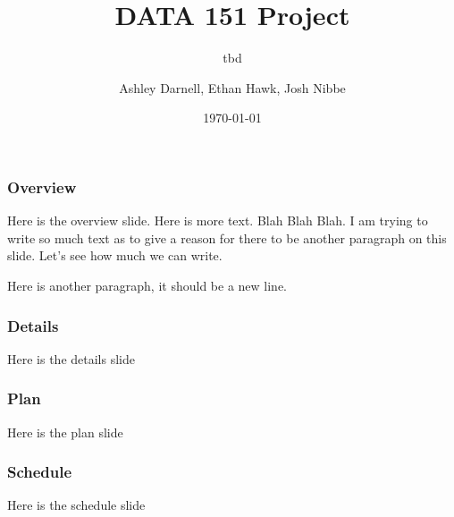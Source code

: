 \documentclass{beamer}
\title{DATA 151 Project}
\subtitle{tbd}
\author{Ashley Darnell, Ethan Hawk, Josh Nibbe}
\institute{Valparaiso Unviersity}
\date{\today}
\begin{document}
\begin{frame}
\titlepage
\end{frame}


\begin{frame}
\frametitle{Overview}
Here is the overview slide. Here is more text. Blah Blah Blah. I am trying to write so much 
text as to give a reason for there to be another paragraph on this slide. Let's see how much
we can write. 

Here is another paragraph, it should be a new line.
\end{frame}


\begin{frame}
\frametitle{Details}
Here is the details slide
\end{frame}


\begin{frame}
\frametitle{Plan}
Here is the plan slide
\end{frame}

\begin{frame}
\frametitle{Schedule}
Here is the schedule slide
\end{frame}
\end{document}
